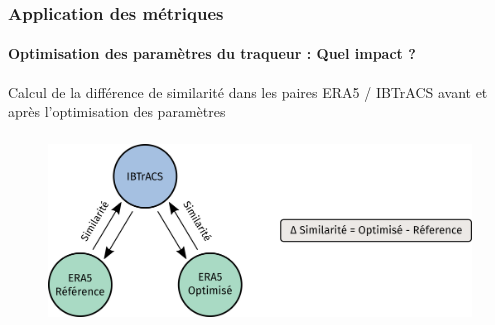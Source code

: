 \documentclass[aspectratio=169, usepdftitle=false, xcolor={dvipsnames}, 9pt,table]{beamer}
\begin{document}
\begin{frame}[c]
    \frametitle{Application des métriques}
    \framesubtitle{Optimisation des paramètres du traqueur : Quel impact ?}
    \small
    \begin{definition}
        \centering
        Calcul de la différence de similarité dans les paires ERA5 / IBTrACS avant et après l'optimisation des paramètres
    \end{definition}
    \vspace{1em}
    \vspace{-1em} 
    \begin{figure}
        \centering
        \includegraphics[height=5cm]{Figures/schema_application_similarite.png}
    \end{figure} 
\end{frame}
\end{document}
